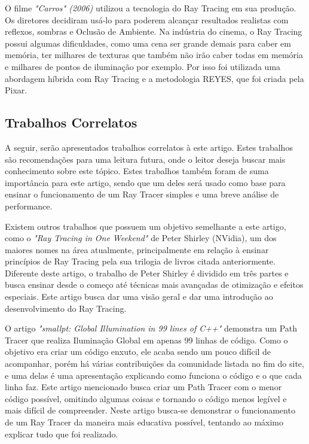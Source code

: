 \documentclass[journal]{IEEEtran}
\begin{document}
O filme \emph{"Carros" (2006)} utilizou a tecnologia do Ray Tracing em sua produção.
Os diretores decidiram usá-lo para poderem alcançar resultados realistas com reflexos,
sombras e Oclusão de Ambiente. Na indústria do cinema, o Ray Tracing possui algumas
dificuldades, como uma cena ser grande demais para caber em memória, ter milhares
de texturas que também não irão caber todas em memória e milhares de pontos de iluminação
por exemplo. Por isso foi utilizada uma abordagem híbrida com Ray Tracing e a metodologia
REYES, que foi criada pela Pixar.
\cite{c9}

\subsection{Trabalhos Correlatos}
A seguir, serão apresentados trabalhos correlatos à este artigo. Estes trabalhos
são recomendações para uma leitura futura, onde o leitor deseja buscar mais
conhecimento sobre este tópico. Estes trabalhos também foram de suma importância
para este artigo, sendo que um deles será usado como base para ensinar o
funcionamento de um Ray Tracer simples e uma breve análise de performance.

Existem outros trabalhos que possuem um objetivo semelhante a este artigo, como o
\emph{"Ray Tracing in One Weekend"} \cite{Shirley2020RTW1} de Peter Shirley (NVidia),
um dos maiores nomes na área atualmente, principalmente em relação à ensinar princípios
de Ray Tracing pela sua trilogia de livros citada anteriormente. Diferente deste artigo,
o trabalho de Peter Shirley é dividido em três partes e busca ensinar desde o começo 
até técnicas mais avançadas de otimização e efeitos especiais. Este artigo busca
dar uma visão geral e dar uma introdução ao desenvolvimento do Ray Tracing.

O artigo \emph{"smallpt: Global Illumination in 99 lines of C++"} \cite{c13} demonstra 
um Path Tracer que realiza Iluminação Global em apenas 99 linhas de código. Como o 
objetivo era criar um código enxuto, ele acaba sendo um pouco difícil de acompanhar,
porém há várias contribuições da comunidade listada no fim do site, e uma delas é
uma apresentação explicando como funciona o código e o que cada linha faz. Este artigo
mencionado busca criar um Path Tracer com o menor código possível, omitindo algumas
coisas e tornando o código menos legível e mais difícil de compreender. Neste artigo
busca-se demonstrar o funcionamento de um Ray Tracer da maneira mais educativa possível,
tentando ao máximo explicar tudo que foi realizado.
\end{document}
